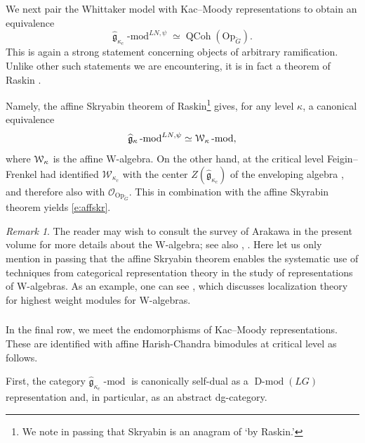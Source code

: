 \documentclass[10pt]{amsart}
\newcommand{\fgc}{\widehat{\fg}_{\kappa_c}}
\newcommand{\fgk}{\widehat{\fg}_\kappa}
\newcommand{\Op}{\mathrm{Op}_{\cG}}
\newcommand{\fg}{\mathfrak{g}}
\newcommand{\on}{\operatorname}
\renewcommand{\mod}{\on{-mod}}
\newcommand{\Dmod}{\on{D-mod}}
\theoremstyle{remark}
\newtheorem{re}[subsubsection]{Remark}
\newcommand{\OO}{\mathscr{O}}
\numberwithin{equation}{section}
\newcommand{\cG}{\check{G}}
\newcommand{\sW}{\EuScript{W}_\kappa}
\renewcommand{\mod}{\operatorname{-mod}}
\newcommand{\QCoh}{\on{QCoh}}
\begin{document}
\subsubsection{} We next pair the Whittaker model with Kac--Moody 
representations to obtain an equivalence
\begin{equation} \label{e:affskr} \fgc\mod^{LN, \psi} \simeq \QCoh(\Op).  
\end{equation}
This is again a strong statement concerning objects of arbitrary ramification. 
Unlike other such statements we are encountering, it is in fact a theorem of 
Raskin \cite{whit}. 


Namely, the affine Skryabin theorem of Raskin\footnote{We note in passing that Skryabin is an anagram of `by Raskin.'}  gives, for any level $\kappa$, a 
canonical equivalence
%
\[  
  \fgk\mod^{LN, \psi} \simeq \sW\mod, 
\]
%
where $\sW$ is the affine W-algebra. On the other hand, at the critical level Feigin--Frenkel had identified $\mathscr{W}_{\kappa_c}$ with the center $Z(\fgc)$ of the enveloping algebra \cite{feiginfrenkel91}, and therefore also with $\OO_{\Op}$. This in combination with the affine Skyrabin theorem yields \eqref{e:affskr}. 

\begin{re} The reader may wish to consult the survey of Arakawa in the present 
volume for more details about the W-algebra; see also \cite{araintro}, \cite{fbz}. Here let us only mention in 
passing that the affine Skryabin theorem enables the systematic use of 
techniques from categorical representation theory in the study of 
representations of W-algebras. As an example, one can see  \cite{locw}, which discusses localization theory for highest weight modules for W-algebras. 
\end{re}




\subsubsection{} \label{ss:affhc}In the final row, we meet the endomorphisms of Kac--Moody 
representations. These are identified with affine Harish-Chandra bimodules at 
critical 
level as follows. 

First, the category $\fgc\mod$ is canonically self-dual as a 
$\Dmod(LG)$ representation and, in particular, as an abstract dg-category. 
\end{document}
